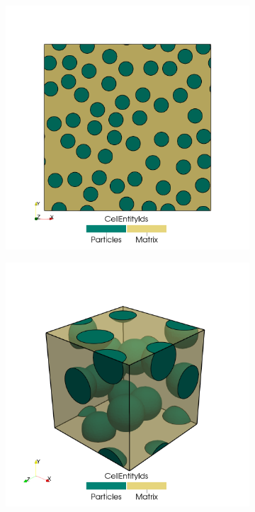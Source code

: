 \begin{figure}[hbt]
\centering
	\begin{subfigure}[b]{0.45\textwidth}
    \centering
    \includegraphics[width=\textwidth]{figures/2d_microstructure}
    \caption{}
    \label{subfig:2d_microstructure}
  \end{subfigure} \hfill
  \begin{subfigure}[b]{0.45\textwidth}
    \centering
    \includegraphics[width=\textwidth]{figures/3d_microstructure}

\end{subfigure}
\end{figure}
